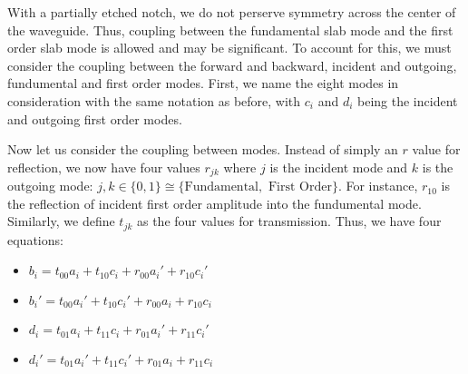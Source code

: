 \documentclass[10pt, letter, oneside,graphicx]{article}
\begin{document}
With a partially etched notch, we do not perserve symmetry across the center of the waveguide. Thus, coupling between the fundamental slab mode and the first order slab mode is allowed and may be significant. To account for this, we must consider the coupling between the forward and backward, incident and outgoing, fundumental and first order modes. First, we name the eight modes in consideration with the same notation as before, with $c_i$ and $d_i$ being the incident and outgoing first order modes.
\newcommand{\m}{1.8}
\begin{center}
\end{center}
Now let us consider the coupling between modes. Instead of simply an $r$ value for reflection, we now have four values $r_{jk}$ where $j$ is the incident mode and $k$ is the outgoing mode: $j, k \in \{ 0, 1 \} \cong \{ \text{Fundamental}, \text{ First Order} \}$. For instance, $r_{10}$ is the reflection of incident first order amplitude into the fundumental mode. Similarly, we define $t_{jk}$ as the four values for transmission. Thus, we have four equations:
\begin{itemize}
\item $b_i = t_{00}a_i + t_{10}c_i + r_{00}a_i' + r_{10}c_i'$
\item $b_i' = t_{00}a_i' + t_{10}c_i' + r_{00}a_i + r_{10}c_i$
\item $d_i = t_{01}a_i + t_{11}c_i + r_{01}a_i' + r_{11}c_i'$
\item $d_i' = t_{01}a_i' + t_{11}c_i' + r_{01}a_i + r_{11}c_i$
\end{itemize}
\end{document}

